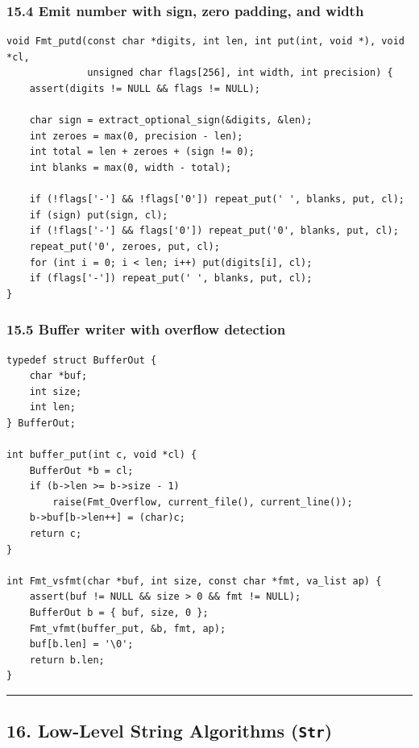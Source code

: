 \documentclass[11pt]{article}
\begin{document}
\subsubsection{15.4 Emit number with sign, zero padding, and width}\label{emit-number-with-sign-zero-padding-and-width}

\begin{verbatim}
void Fmt_putd(const char *digits, int len, int put(int, void *), void *cl,
              unsigned char flags[256], int width, int precision) {
    assert(digits != NULL && flags != NULL);

    char sign = extract_optional_sign(&digits, &len);
    int zeroes = max(0, precision - len);
    int total = len + zeroes + (sign != 0);
    int blanks = max(0, width - total);

    if (!flags['-'] && !flags['0']) repeat_put(' ', blanks, put, cl);
    if (sign) put(sign, cl);
    if (!flags['-'] && flags['0']) repeat_put('0', blanks, put, cl);
    repeat_put('0', zeroes, put, cl);
    for (int i = 0; i < len; i++) put(digits[i], cl);
    if (flags['-']) repeat_put(' ', blanks, put, cl);
}
\end{verbatim}

\subsubsection{15.5 Buffer writer with overflow detection}\label{buffer-writer-with-overflow-detection}

\begin{verbatim}
typedef struct BufferOut {
    char *buf;
    int size;
    int len;
} BufferOut;

int buffer_put(int c, void *cl) {
    BufferOut *b = cl;
    if (b->len >= b->size - 1)
        raise(Fmt_Overflow, current_file(), current_line());
    b->buf[b->len++] = (char)c;
    return c;
}

int Fmt_vsfmt(char *buf, int size, const char *fmt, va_list ap) {
    assert(buf != NULL && size > 0 && fmt != NULL);
    BufferOut b = { buf, size, 0 };
    Fmt_vfmt(buffer_put, &b, fmt, ap);
    buf[b.len] = '\0';
    return b.len;
}
\end{verbatim}

\begin{center}\rule{0.5\linewidth}{0.5pt}\end{center}

\subsection{\texorpdfstring{16. Low-Level String Algorithms (\texttt{Str})}{16. Low-Level String Algorithms (Str)}}\label{low-level-string-algorithms-str}
\end{document}
